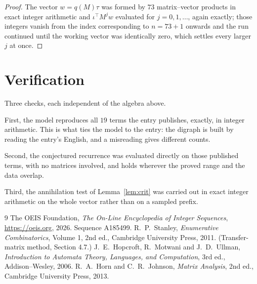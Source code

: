 \documentclass[11pt,a4paper]{article}
\theoremstyle{plain}
\theoremstyle{definition}
\begin{document}
\begin{proof}
The vector $w=q(M)\tau$ was formed by $73$ matrix--vector products in exact integer
arithmetic and $\iota^{\!\top}M^{j}w$ evaluated for $j=0,1,\dots$, again exactly; those
integers vanish from the index corresponding to $n=73+1$ onwards and the run continued
until the working vector was identically zero, which settles every larger $j$ at once.
\end{proof}

\section{Verification}

Three checks, each independent of the algebra above.

First, the model reproduces all $19$ terms the entry publishes, exactly, in integer
arithmetic. This is what ties the model to the entry: the digraph is built by reading the
entry's English, and a misreading gives different counts.

Second, the conjectured recurrence was evaluated directly on those published terms, with no
matrices involved, and holds wherever the proved range and the data overlap.

Third, the annihilation test of Lemma~\ref{lem:crit} was carried out in exact integer
arithmetic on the whole vector rather than on a sampled prefix.

\begin{thebibliography}{9}
 The OEIS Foundation, \emph{The On-Line Encyclopedia of Integer
Sequences}, \url{https://oeis.org}, 2026. Sequence A185499.
 R.~P.~Stanley, \emph{Enumerative Combinatorics}, Volume 1, 2nd ed.,
Cambridge University Press, 2011. (Transfer-matrix method, Section 4.7.)
 J.~E.~Hopcroft, R.~Motwani and J.~D.~Ullman, \emph{Introduction to Automata
Theory, Languages, and Computation}, 3rd ed., Addison--Wesley, 2006.
 R.~A.~Horn and C.~R.~Johnson, \emph{Matrix Analysis}, 2nd ed., Cambridge
University Press, 2013.
\end{thebibliography}
\end{document}
